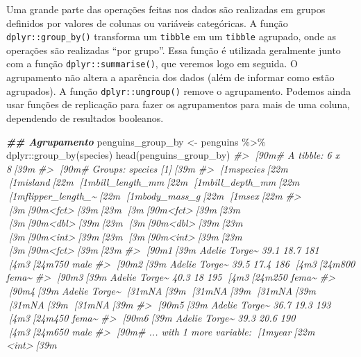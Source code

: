\documentclass[
]{book}
\newenvironment{Shaded}{\begin{snugshade}}{\end{snugshade}}
\newcommand{\CommentTok}[1]{\textcolor[rgb]{0.37,0.37,0.37}{\textit{#1}}}
\newcommand{\DocumentationTok}[1]{\textcolor[rgb]{0.37,0.37,0.37}{\textbf{\textit{#1}}}}
\newcommand{\FunctionTok}[1]{\textcolor[rgb]{0,0,0}{#1}}
\newcommand{\NormalTok}[1]{#1}
\newcommand{\OtherTok}[1]{\textcolor[rgb]{0.37,0.37,0.37}{#1}}
\newcommand{\SpecialCharTok}[1]{\textcolor[rgb]{0,0,0}{#1}}
\begin{document}
Uma grande parte das operações feitas nos dados são realizadas em grupos definidos por valores de colunas ou variáveis categóricas. A função \texttt{dplyr::group\_by()} transforma um \texttt{tibble} em um \texttt{tibble} agrupado, onde as operações são realizadas ``por grupo''. Essa função é utilizada geralmente junto com a função \texttt{dplyr::summarise()}, que veremos logo em seguida. O agrupamento não altera a aparência dos dados (além de informar como estão agrupados). A função \texttt{dplyr::ungroup()} remove o agrupamento. Podemos ainda usar funções de replicação para fazer os agrupamentos para mais de uma coluna, dependendo de resultados booleanos.

\begin{Shaded}
\begin{Highlighting}[]
\DocumentationTok{\#\# Agrupamento}
\NormalTok{penguins\_group\_by }\OtherTok{\textless{}{-}}\NormalTok{ penguins }\SpecialCharTok{\%\textgreater{}\%} 
\NormalTok{  dplyr}\SpecialCharTok{::}\FunctionTok{group\_by}\NormalTok{(species)}
\FunctionTok{head}\NormalTok{(penguins\_group\_by)}
\CommentTok{\#\textgreater{} [90m\# A tibble: 6 x 8[39m}
\CommentTok{\#\textgreater{} [90m\# Groups:   species [1][39m}
\CommentTok{\#\textgreater{}   [1mspecies[22m [1misland[22m [1mbill\_length\_mm[22m [1mbill\_depth\_mm[22m [1mflipper\_length\_\textasciitilde{}[22m [1mbody\_mass\_g[22m [1msex[22m  }
\CommentTok{\#\textgreater{}   [3m[90m\textless{}fct\textgreater{}[39m[23m   [3m[90m\textless{}fct\textgreater{}[39m[23m           [3m[90m\textless{}dbl\textgreater{}[39m[23m         [3m[90m\textless{}dbl\textgreater{}[39m[23m            [3m[90m\textless{}int\textgreater{}[39m[23m       [3m[90m\textless{}int\textgreater{}[39m[23m [3m[90m\textless{}fct\textgreater{}[39m[23m}
\CommentTok{\#\textgreater{} [90m1[39m Adelie  Torge\textasciitilde{}           39.1          18.7              181        [4m3[24m750 male }
\CommentTok{\#\textgreater{} [90m2[39m Adelie  Torge\textasciitilde{}           39.5          17.4              186        [4m3[24m800 fema\textasciitilde{}}
\CommentTok{\#\textgreater{} [90m3[39m Adelie  Torge\textasciitilde{}           40.3          18                195        [4m3[24m250 fema\textasciitilde{}}
\CommentTok{\#\textgreater{} [90m4[39m Adelie  Torge\textasciitilde{}           [31mNA[39m            [31mNA[39m                 [31mNA[39m          [31mNA[39m [31mNA[39m   }
\CommentTok{\#\textgreater{} [90m5[39m Adelie  Torge\textasciitilde{}           36.7          19.3              193        [4m3[24m450 fema\textasciitilde{}}
\CommentTok{\#\textgreater{} [90m6[39m Adelie  Torge\textasciitilde{}           39.3          20.6              190        [4m3[24m650 male }
\CommentTok{\#\textgreater{} [90m\# ... with 1 more variable: [1myear[22m \textless{}int\textgreater{}[39m}


\end{Highlighting}
\end{Shaded}
\end{document}
